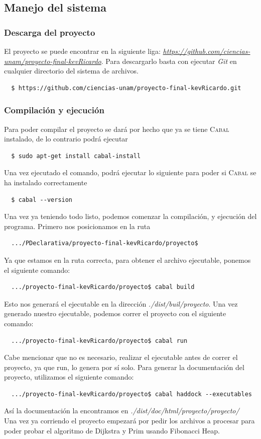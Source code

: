 \documentclass[a4paper, titlepage, 12pt]{article}
\theoremstyle{definition}%
\theoremstyle{Teorema}
\theoremstyle{break}
\begin{document}
\subsection{Manejo del sistema}
\subsubsection*{Descarga del proyecto}
El proyecto se puede encontrar en la siguiente liga: \textit{\href{https://github.com/ciencias-unam/proyecto-final-kevRicardo}{https://github.com/ciencias-unam/proyecto-final-kevRicardo}}. 
Para descargarlo basta con ejecutar \textit{Git} en cualquier directorio del sistema de archivos.\\
\small
\begin{lstlisting}
  $ https://github.com/ciencias-unam/proyecto-final-kevRicardo.git
\end{lstlisting}
\subsubsection*{Compilación y ejecución}
Para poder compilar el proyecto se dará por hecho que ya se tiene \textsc{Cabal} instalado, de lo contrario podrá ejecutar 
\begin{lstlisting}
  $ sudo apt-get install cabal-install
\end{lstlisting}
Una vez ejecutado el comando, podrá ejecutar lo siguiente para poder si \textsc{Cabal} se ha instalado correctamente
\begin{lstlisting}
  $ cabal --version
\end{lstlisting}

Una vez ya teniendo todo listo, podemos comenzar la compilación, y ejecución del programa. Primero nos posicionamos en la ruta
\begin{lstlisting}
  .../PDeclarativa/proyecto-final-kevRicardo/proyecto$
\end{lstlisting}
Ya que estamos en la ruta correcta, para obtener el archivo ejecutable, ponemos el siguiente comando:
\begin{lstlisting}
  .../proyecto-final-kevRicardo/proyecto$ cabal build
\end{lstlisting}
Esto nos generará el ejecutable en la dirección \textit{./dist/buil/proyecto}.
Una vez generado nuestro ejecutable, podemos correr el proyecto con el siguiente comando:
\begin{lstlisting}
  .../proyecto-final-kevRicardo/proyecto$ cabal run
\end{lstlisting}
Cabe mencionar que no es necesario, realizar el ejecutable antes de correr el proyecto, ya que run, lo genera por sí solo.
Para generar la documentación del proyecto, utilizamos el siguiente comando:
\begin{lstlisting}
  .../proyecto-final-kevRicardo/proyecto$ cabal haddock --executables
\end{lstlisting}
Así la documentación la encontramos en \textit{./dist/doc/html/proyecto/proyecto/}\\

Una vez ya corriendo el proyecto empezará por pedir los archivos a procesar para poder probar el algoritmo de Dijkstra y Prim 
usando Fibonacci Heap.
\end{document}
